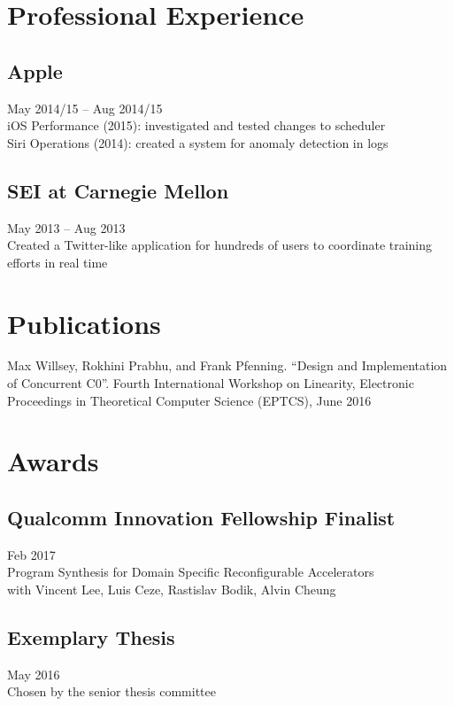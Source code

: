 \documentclass{article}
\begin{document}
\section{Professional Experience}

\subsection{Apple}
\hfill May 2014/15 -- Aug 2014/15 \\
iOS Performance (2015): investigated and tested changes to scheduler \\
Siri Operations (2014): created a system for anomaly detection in logs

\subsection{SEI at Carnegie Mellon}
\hfill May 2013 -- Aug 2013 \\
Created a Twitter-like application for hundreds of users to coordinate training efforts in real time

\section{Publications}

Max Willsey, Rokhini Prabhu, and Frank Pfenning.
``Design and Implementation of Concurrent C0''.
Fourth International Workshop on Linearity, Electronic Proceedings in Theoretical Computer Science (EPTCS), June 2016

\section{Awards}

\subsection{Qualcomm Innovation Fellowship Finalist}
\hfill Feb 2017 \\
Program Synthesis for Domain Specific Reconfigurable Accelerators \\
with Vincent Lee, Luis Ceze, Rastislav Bodik, Alvin Cheung

\subsection{Exemplary Thesis}
\hfill May 2016 \\
Chosen by the senior thesis committee
\end{document}
